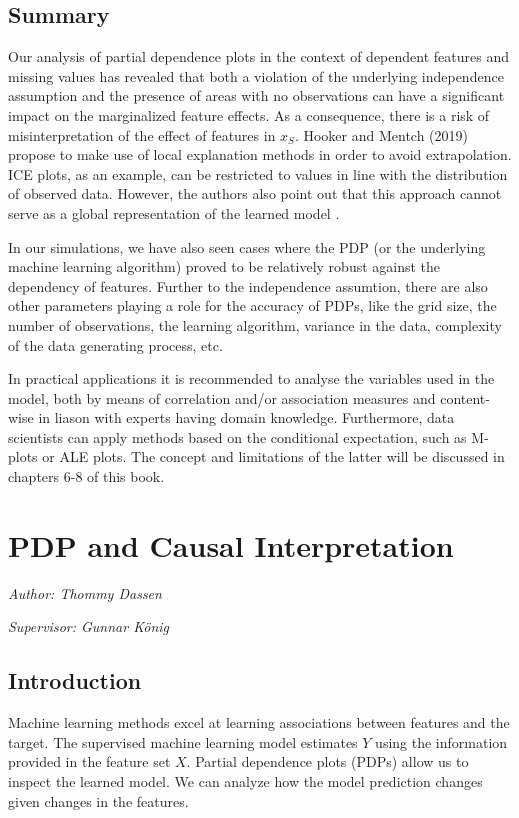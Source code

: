 \documentclass[]{krantz}
\begin{document}
\section{Summary}\label{summary}

Our analysis of partial dependence plots in the context of dependent
features and missing values has revealed that both a violation of the
underlying independence assumption and the presence of areas with no
observations can have a significant impact on the marginalized feature
effects. As a consequence, there is a risk of misinterpretation of the
effect of features in \(x_S\). Hooker and Mentch (2019) propose to make
use of local explanation methods in order to avoid extrapolation. ICE
plots, as an example, can be restricted to values in line with the
distribution of observed data. However, the authors also point out that
this approach cannot serve as a global representation of the learned
model \citep{2019arXiv190503151H}.

In our simulations, we have also seen cases where the PDP (or the
underlying machine learning algorithm) proved to be relatively robust
against the dependency of features. Further to the independence
assumtion, there are also other parameters playing a role for the
accuracy of PDPs, like the grid size, the number of observations, the
learning algorithm, variance in the data, complexity of the data
generating process, etc.

In practical applications it is recommended to analyse the variables
used in the model, both by means of correlation and/or association
measures and content-wise in liason with experts having domain
knowledge. Furthermore, data scientists can apply methods based on the
conditional expectation, such as M-plots or ALE plots. The concept and
limitations of the latter will be discussed in chapters 6-8 of this
book.

\chapter{PDP and Causal Interpretation}\label{pdp-causal}

\emph{Author: Thommy Dassen}

\emph{Supervisor: Gunnar König}

\section{Introduction}\label{introduction-1}

Machine learning methods excel at learning associations between features
and the target. The supervised machine learning model estimates \(Y\)
using the information provided in the feature set \(X\). Partial
dependence plots (PDPs) allow us to inspect the learned model. We can
analyze how the model prediction changes given changes in the features.
\end{document}
